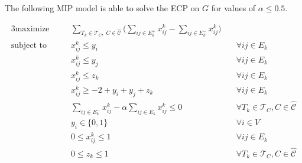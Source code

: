 The following \acrshort{MIP} model is able to solve the \acrshort{ECP} on $G$
for values of $\alpha \leq 0.5$.

\begin{alignat}{3}
	\label{eq:ecp-exact1}
	\text{maximize}     &                                                 & \sum_{ T_{k} \in \mathcal{T}_{C}, \; C \in
		\mathcal{\hat{C}} } \big( \sum^{}_{ij \in E^{+}_k } x_{ij}
	^{k} - \sum_{ij \in E^{-}_k } x_{ij} ^{k} \big)                                                                                                                                               \\
	\label{eq:ecp-v1}
	\text{subject to}   & \quad                                           & x _{ij}^{k}  \leq y_i                                               & \quad \forall ij \in E_k                        \\
	\label{eq:ecp-v2}
	                    &                                                 & x _{ij}^{k}  \leq y_j                                               & \quad \forall ij \in E_k                        \\
	\label{eq:ecp-t1}
	                    &                                                 & x _{ij}^{k}  \leq z_k                                               & \quad \forall ij \in E_k                        \\
	\label{eq:ecp-e1}
	                    &                                                 & x _{ij} ^{k} \geq - 2 + y_i + y_j + z_k                             & \quad \forall ij \in E_k                        \\
	\label{eq:ecp-alpha-constraint1}
	                    &                                                 & \sum^{}_{ij \in E_k^{-} } x_{ij}^{k}  - \alpha \sum^{}_{ij \in E_k}
	x_{ij} ^{k}  \leq 0 & \quad \forall T_{k} \in \mathcal{T} _{C}, C \in
	\hat{\mathcal{C}}                                                                                                                                                                             \\
	\label{eq:ecp-vertex-def1}
	                    &                                                 & y _{i} \in  \{0, 1\}                                                & \quad \forall i \in V                           \\
	\label{eq:ecp-edge-def1}
	                    &                                                 & 0 \leq x _{ij} ^{k}  \leq 1                                         & \quad \forall ij \in E_k                        \\
	\label{eq:ecp-thread-def1}
	                    &                                                 & 0 \leq z _{k} \leq 1                                                & \quad \forall T_{k} \in \mathcal{T} _{C}, C \in
	\hat{\mathcal{C}}
\end{alignat}

